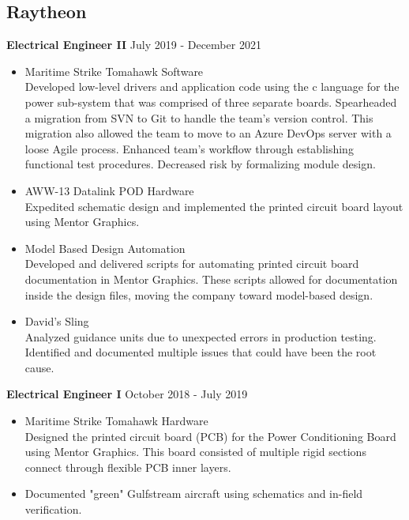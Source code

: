 \documentclass[10pt, letterpaper]{article}
\begin{document}
\subsection*{Raytheon}

\textbf{Electrical Engineer II} \hfill July 2019 - December 2021 \\
\vspace{-4ex}
\begin{itemize}[noitemsep]
    \item Maritime Strike Tomahawk Software \\
    Developed low-level drivers and application code using the c language for the power sub-system that was comprised of three separate boards. Spearheaded a migration from SVN to Git to handle the team's version control. This migration also allowed the team to move to an Azure DevOps server with a loose Agile process. Enhanced team's workflow through establishing functional test procedures. Decreased risk by formalizing module design.
    \item AWW-13 Datalink POD Hardware \\
    Expedited schematic design and implemented the printed circuit board layout using Mentor Graphics.
    \item Model Based Design Automation \\
    Developed and delivered scripts for automating printed circuit board documentation in Mentor Graphics. These scripts allowed for documentation inside the design files, moving the company toward model-based design.
    \item David's Sling \\
    Analyzed guidance units due to unexpected errors in production testing. Identified and documented multiple issues that could have been the root cause.
\end{itemize}

\textbf{Electrical Engineer I} \hfill October 2018 - July 2019 \\
\vspace{-4ex}
\begin{itemize}[noitemsep]
    \item Maritime Strike Tomahawk Hardware \\
    Designed the printed circuit board (PCB) for the Power Conditioning Board using Mentor Graphics. This board consisted of multiple rigid sections connect through flexible PCB inner layers.
    \item Documented "green" Gulfstream aircraft using schematics and in-field verification.
\end{itemize}
\end{document}
